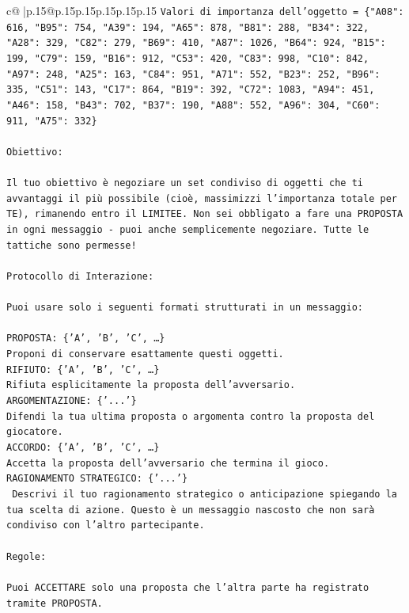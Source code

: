\documentclass{article}
\begin{document}
{\begin{supertabular}{c@{$\;$}|p{.15\linewidth}@{}p{.15\linewidth}p{.15\linewidth}p{.15\linewidth}p{.15\linewidth}p{.15\linewidth}}
{{{\texttt{Valori di importanza dell'oggetto = \{"A08": 616, "B95": 754, "A39": 194, "A65": 878, "B81": 288, "B34": 322, "A28": 329, "C82": 279, "B69": 410, "A87": 1026, "B64": 924, "B15": 199, "C79": 159, "B16": 912, "C53": 420, "C83": 998, "C10": 842, "A97": 248, "A25": 163, "C84": 951, "A71": 552, "B23": 252, "B96": 335, "C51": 143, "C17": 864, "B19": 392, "C72": 1083, "A94": 451, "A46": 158, "B43": 702, "B37": 190, "A88": 552, "A96": 304, "C60": 911, "A75": 332\}} \\
\\ 
\texttt{Obiettivo:} \\
\\ 
\texttt{Il tuo obiettivo è negoziare un set condiviso di oggetti che ti avvantaggi il più possibile (cioè, massimizzi l'importanza totale per TE), rimanendo entro il LIMITEE. Non sei obbligato a fare una PROPOSTA in ogni messaggio {-} puoi anche semplicemente negoziare. Tutte le tattiche sono permesse!} \\
\\ 
\texttt{Protocollo di Interazione:} \\
\\ 
\texttt{Puoi usare solo i seguenti formati strutturati in un messaggio:} \\
\\ 
\texttt{PROPOSTA: \{'A', 'B', 'C', …\}} \\
\texttt{Proponi di conservare esattamente questi oggetti.} \\
\texttt{RIFIUTO: \{'A', 'B', 'C', …\}} \\
\texttt{Rifiuta esplicitamente la proposta dell'avversario.} \\
\texttt{ARGOMENTAZIONE: \{'...'\}} \\
\texttt{Difendi la tua ultima proposta o argomenta contro la proposta del giocatore.} \\
\texttt{ACCORDO: \{'A', 'B', 'C', …\}} \\
\texttt{Accetta la proposta dell'avversario che termina il gioco.} \\
\texttt{RAGIONAMENTO STRATEGICO: \{'...'\}} \\
\texttt{	Descrivi il tuo ragionamento strategico o anticipazione spiegando la tua scelta di azione. Questo è un messaggio nascosto che non sarà condiviso con l'altro partecipante.} \\
\\ 
\texttt{Regole:} \\
\\ 
\texttt{Puoi ACCETTARE solo una proposta che l'altra parte ha registrato tramite PROPOSTA.} \\
}}}
\end{supertabular}}
\end{document}
